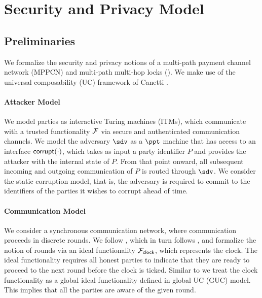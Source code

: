 \section{Security and Privacy Model}
\label{sec:security-model}

\subsection{Preliminaries}
\label{sec:model-prelims}

We formalize the security and privacy notions of a multi-path payment channel network (MPPCN) 
and multi-path multi-hop locks (\sysname). We make use of the universal composability (UC) 
framework of Canetti \cite{canetti}.

\paragraph{Attacker Model}
We model parties as interactive Turing machines (ITMs), which communicate with a trusted 
functionality $\mathcal{F}$ via secure and authenticated communication channels. We model the 
adversary $\sdv$ as a $\ppt$ machine that has access to an interface $\mathsf{corrupt}(\cdot)$, 
which takes as input a party identifier $P$ and provides the attacker with the internal 
state of $P$. From that point onward, all subsequent incoming and outgoing communication 
of $P$ is routed through $\sdv$. We consider the static corruption model, that is, the 
adversary is required to commit to the identifiers of the parties it wishes to corrupt 
ahead of time.

\paragraph{Communication Model}

We consider a synchronous communication network, where communication proceeds in discrete 
rounds. We follow \cite{kmtz}, which in turn follows \cite{mpvsc}, and formalize the notion of 
rounds via an ideal functionality $\mathcal{F}_{\mathsf{clock}}$, which represents the clock. The ideal 
functionality requires all honest parties to indicate that they are ready to proceed to the next 
round before the clock is ticked. Similar to \cite{mpvsc} we treat the clock functionality as a 
global ideal functionality defined in global UC (GUC) model. This implies that all the parties 
are aware of the given round. 

